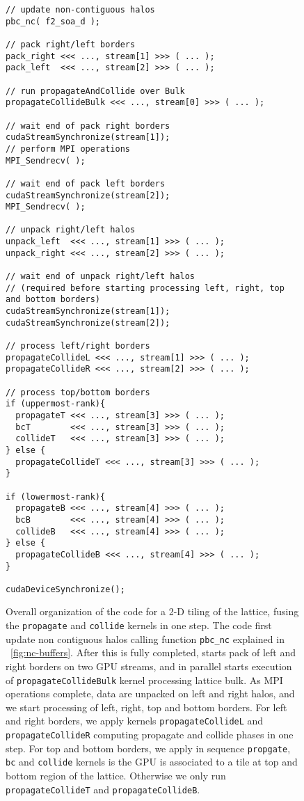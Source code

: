 \documentclass{elsarticle}
\begin{document}

\newpage

%
\begin{figure}
\centering
\begin{lstlisting}[basicstyle=\tiny]
// update non-contiguous halos
pbc_nc( f2_soa_d );

// pack right/left borders
pack_right <<< ..., stream[1] >>> ( ... );    
pack_left  <<< ..., stream[2] >>> ( ... ); 

// run propagateAndCollide over Bulk
propagateCollideBulk <<< ..., stream[0] >>> ( ... );

// wait end of pack right borders
cudaStreamSynchronize(stream[1]);
// perform MPI operations
MPI_Sendrecv( );     

// wait end of pack left borders
cudaStreamSynchronize(stream[2]);
MPI_Sendrecv( );

// unpack right/left halos
unpack_left  <<< ..., stream[1] >>> ( ... );    
unpack_right <<< ..., stream[2] >>> ( ... );

// wait end of unpack right/left halos 
// (required before starting processing left, right, top and bottom borders)
cudaStreamSynchronize(stream[1]);
cudaStreamSynchronize(stream[2]);

// process left/right borders
propagateCollideL <<< ..., stream[1] >>> ( ... );    
propagateCollideR <<< ..., stream[2] >>> ( ... );

// process top/bottom borders
if (uppermost-rank){
  propagateT <<< ..., stream[3] >>> ( ... );    
  bcT        <<< ..., stream[3] >>> ( ... );    
  collideT   <<< ..., stream[3] >>> ( ... );
} else { 
  propagateCollideT <<< ..., stream[3] >>> ( ... );
}

if (lowermost-rank){
  propagateB <<< ..., stream[4] >>> ( ... );    
  bcB        <<< ..., stream[4] >>> ( ... );    
  collideB   <<< ..., stream[4] >>> ( ... );
} else { 
  propagateCollideB <<< ..., stream[4] >>> ( ... );
}

cudaDeviceSynchronize();
\end{lstlisting}
\caption{\label{fig:2D-code-with-overlap-fused}
Overall organization of the code for a 2-D tiling of the lattice, fusing
the {\tt propagate} and {\tt collide} kernels in one step.
%
The code first update non contiguous halos calling function {\tt pbc\_nc} 
explained in \figurename~\ref{fig:nc-buffers}.
%
After this is fully completed, starts pack of left and right borders on two 
GPU streams, and in parallel starts execution of {\tt propagateCollideBulk} 
kernel processing lattice bulk.
%
As MPI operations complete, data are unpacked on left and right halos, and 
we start processing of left, right, top and bottom borders.
%
For left and right borders, we apply kernels {\tt propagateCollideL} and 
{\tt propagateCollideR} computing propagate and collide phases in one step.
%
For top and bottom borders, we apply in sequence {\tt propgate}, {\tt bc} and 
{\tt collide} kernels is the GPU is associated to a tile at top and bottom 
region of the lattice. Otherwise we only run {\tt propagateCollideT} and 
{\tt propagateCollideB}.
}
%
\end{figure}


\end{document}
